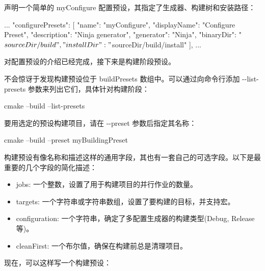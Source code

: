
声明一个简单的 myConfigure 配置预设，其指定了生成器、构建树和安装路径：


\begin{json}
...
    "configurePresets": [
        {
            "name": "myConfigure",
            "displayName": "Configure Preset",
            "description": "Ninja generator",
            "generator": "Ninja",
            "binaryDir": "${sourceDir}/build",
            "installDir": "${sourceDir}/build/install"
        }
    ],
...
\end{json}

对配置预设的介绍已经完成，接下来是构建阶段预设。


不会惊讶于发现构建预设位于 buildPresets 数组中。可以通过向命令行添加 -{}-list-presets 参数来列出它们，具体针对构建阶段：

\begin{shell}
cmake --build --list-presets
\end{shell}

要用选定的预设构建项目，请在 -{}-preset 参数后指定其名称：

\begin{shell}
cmake --build --preset myBuildingPreset
\end{shell}

构建预设有像名称和描述这样的通用字段，其也有一套自己的可选字段。以下是最重要的几个字段的简化描述：

\begin{itemize}
\item
jobs: 一个整数，设置了用于构建项目的并行作业的数量。

\item
targets: 一个字符串或字符串数组，设置了要构建的目标，并支持宏。

\item
configuration: 一个字符串，确定了多配置生成器的构建类型(Debug, Release等)。

\item
cleanFirst: 一个布尔值，确保在构建前总是清理项目。
\end{itemize}

现在，可以这样写一个构建预设：


